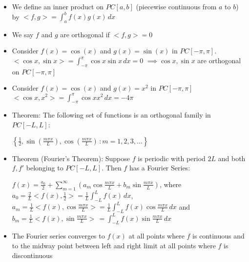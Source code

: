 \documentclass[12pt]{article}
\begin{document}
\begin{itemize}
    \item We define an inner product on $PC[a, b]$ (piecewise continuous from $a$ to $b$) by $<f, g> = \int_a^{b} f(x)g(x) \, dx$
    \item We say $f$ and $g$ are orthogonal if $<f,g> = 0$
    \item Consider $f(x)  =\cos(x)$ and $g(x) = \sin (x)$ in $PC[- \pi, \pi]$. $<\cos x, \sin x> = \int_{- \pi }^{\pi} \cos x \sin x \, dx = 0$ $\implies \cos x, \sin x$ are orthogonal on $PC [- \pi, \pi]$
    \item Consider $f(x) = \cos (x)$ and $g(x) = x^2$ in $PC[- \pi, \pi]$ $< \cos x, x^2 > = \int_{- \pi}^{\pi} \cos x x^2 \, dx = -4 \pi$
    \item Theorem: The following set of functions is an orthogonal family in $PC[-L, L]$: 
    
    $\left\{ \frac{1}{2}, \sin (\frac{m \pi x}{L}), \cos (\frac{m \pi x}{L}) \,: m = 1, 2, 3, \dots \right\}$
    \item Theorem (Fourier's Theorem): Suppose $f$ is periodic with period $2L$ and both $f, f'$ belonging to $PC[-L, L]$. Then $f$ has a Fourier Series: 
    
    $f(x) = \frac{a_0}{2} + \sum_{m=1}^{\infty} \left( a_m \cos \frac{m \pi x}{L} + b_m \sin \frac{m \pi x}{L} \right)$, where $a_0 = \frac{2}{L} < f(x), \frac{1}{2} > = \frac{1}{L} \int_{-L}^{L} f(x) \, dx$, $a_m = \frac{1}{L} < f(x), \cos \frac{m \pi x}{L} > = \frac{1}{L} \int_{-L}^{L} f(x) \cos \frac{m \pi x}{L} \, dx$ and $b_m = \frac{1}{L} < f(x), \sin \frac{m \pi x}{L} > \, = \int_{-L}^{L} f(x) \sin \frac{m \pi x}{L} \, dx$
    \item The Fourier series converges to $f(x)$ at all points where $f$ is continuous and to the midway point between left and right limit at all points where $f$ is discontinuous
\end{itemize}
\end{document}
